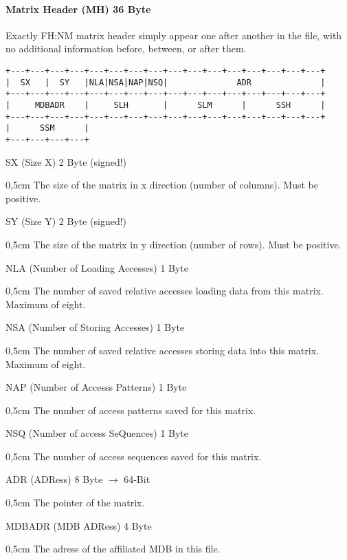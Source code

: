 \paragraph{Matrix Header (MH) 36 Byte}$\;$ \\

Exactly FH:NM matrix header simply appear one after another in the file, with no additional information 
before, between, or after them.
\begin{verbatim}
+---+---+---+---+---+---+---+---+---+---+---+---+---+---+---+---+
|  SX   |  SY   |NLA|NSA|NAP|NSQ|              ADR              |
+---+---+---+---+---+---+---+---+---+---+---+---+---+---+---+---+
|     MDBADR    |     SLH       |      SLM      |      SSH      |
+---+---+---+---+---+---+---+---+---+---+---+---+---+---+---+---+
|      SSM      |
+---+---+---+---+
\end{verbatim}
SX (Size X) 2 Byte (signed!)
\begin{addmargin}[0,5cm]{0,5cm} 
	The size of the matrix in x direction (number of columns). Must be positive.
\end{addmargin}
SY (Size Y) 2 Byte (signed!)
\begin{addmargin}[0,5cm]{0,5cm} 
	The size of the matrix in y direction (number of rows). Must be positive.
\end{addmargin}
NLA (Number of Loading Accesses) 1 Byte
\begin{addmargin}[0,5cm]{0,5cm} 
	The number of saved relative accesses loading data from this matrix. Maximum of eight.
\end{addmargin}
NSA (Number of Storing Accesses) 1 Byte
\begin{addmargin}[0,5cm]{0,5cm} 
	The number of saved relative accesses storing data into this matrix. Maximum of eight.
\end{addmargin}
NAP (Number of Accesss Patterns) 1 Byte
\begin{addmargin}[0,5cm]{0,5cm} 
	The number of access patterns saved for this matrix.
\end{addmargin}
NSQ (Number of access SeQuences) 1 Byte
\begin{addmargin}[0,5cm]{0,5cm} 
	The number of access sequences saved for this matrix.
\end{addmargin}
ADR (ADRess) 8 Byte $\rightarrow$ 64-Bit
\begin{addmargin}[0,5cm]{0,5cm} 
	The pointer of the matrix.
\end{addmargin}
MDBADR (MDB ADRess) 4 Byte
\begin{addmargin}[0,5cm]{0,5cm} 
	The adress of the affiliated MDB in this file.
\end{addmargin}
